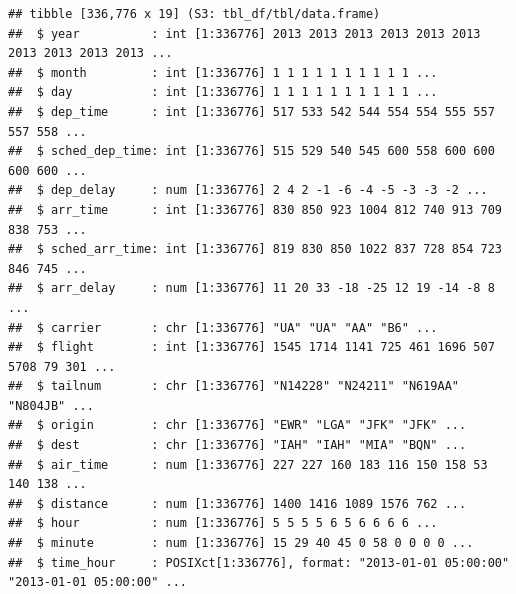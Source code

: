 \documentclass[]{scrbook}
\newenvironment{Shaded}{\begin{snugshade}}{\end{snugshade}}
\newcommand{\CommentTok}[1]{\textcolor[rgb]{0.56,0.35,0.01}{\textit{#1}}}
\newcommand{\DataTypeTok}[1]{\textcolor[rgb]{0.13,0.29,0.53}{#1}}
\newcommand{\DecValTok}[1]{\textcolor[rgb]{0.00,0.00,0.81}{#1}}
\newcommand{\KeywordTok}[1]{\textcolor[rgb]{0.13,0.29,0.53}{\textbf{#1}}}
\newcommand{\NormalTok}[1]{#1}
\newcommand{\OperatorTok}[1]{\textcolor[rgb]{0.81,0.36,0.00}{\textbf{#1}}}
\newcommand{\StringTok}[1]{\textcolor[rgb]{0.31,0.60,0.02}{#1}}
\renewenvironment{Shaded} {\begin{snugshade}\small} {\end{snugshade}}
\begin{document}
\begin{verbatim}
## tibble [336,776 x 19] (S3: tbl_df/tbl/data.frame)
##  $ year          : int [1:336776] 2013 2013 2013 2013 2013 2013 2013 2013 2013 2013 ...
##  $ month         : int [1:336776] 1 1 1 1 1 1 1 1 1 1 ...
##  $ day           : int [1:336776] 1 1 1 1 1 1 1 1 1 1 ...
##  $ dep_time      : int [1:336776] 517 533 542 544 554 554 555 557 557 558 ...
##  $ sched_dep_time: int [1:336776] 515 529 540 545 600 558 600 600 600 600 ...
##  $ dep_delay     : num [1:336776] 2 4 2 -1 -6 -4 -5 -3 -3 -2 ...
##  $ arr_time      : int [1:336776] 830 850 923 1004 812 740 913 709 838 753 ...
##  $ sched_arr_time: int [1:336776] 819 830 850 1022 837 728 854 723 846 745 ...
##  $ arr_delay     : num [1:336776] 11 20 33 -18 -25 12 19 -14 -8 8 ...
##  $ carrier       : chr [1:336776] "UA" "UA" "AA" "B6" ...
##  $ flight        : int [1:336776] 1545 1714 1141 725 461 1696 507 5708 79 301 ...
##  $ tailnum       : chr [1:336776] "N14228" "N24211" "N619AA" "N804JB" ...
##  $ origin        : chr [1:336776] "EWR" "LGA" "JFK" "JFK" ...
##  $ dest          : chr [1:336776] "IAH" "IAH" "MIA" "BQN" ...
##  $ air_time      : num [1:336776] 227 227 160 183 116 150 158 53 140 138 ...
##  $ distance      : num [1:336776] 1400 1416 1089 1576 762 ...
##  $ hour          : num [1:336776] 5 5 5 5 6 5 6 6 6 6 ...
##  $ minute        : num [1:336776] 15 29 40 45 0 58 0 0 0 0 ...
##  $ time_hour     : POSIXct[1:336776], format: "2013-01-01 05:00:00" "2013-01-01 05:00:00" ...
\end{verbatim}

\begin{Shaded}
\end{Shaded}
\end{document}
